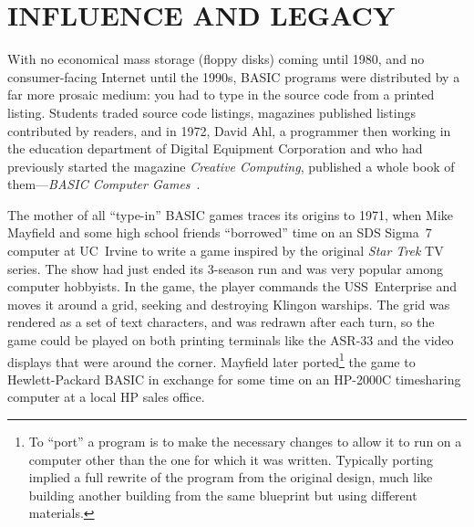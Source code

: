

\section{INFLUENCE AND LEGACY}


With no economical mass storage (floppy disks) coming until 1980, and no
consumer-facing Internet until the 1990s, BASIC programs were
distributed by a far more prosaic medium: you had to type in the source
code from a printed listing.  Students traded source code listings, 
magazines published listings contributed by readers, and in 1972, David
Ahl, a programmer then working in the education department of Digital Equipment
Corporation and who had previously started the magazine \emph{Creative
  Computing}, published a whole book of them---\emph{BASIC Computer
  Games}~\cite{basic_computer_games}. 


The mother of all ``type-in'' BASIC games traces its origins to
1971, when Mike Mayfield and some high school friends ``borrowed'' time
on an SDS Sigma~7 computer at UC~Irvine to write a game inspired by the
original \emph{Star Trek} TV series.  The show had just ended its 3-season run and
was very popular among computer hobbyists.
In the game, the player commands the USS~Enterprise and moves it around
a grid, seeking and destroying Klingon warships.  The grid was rendered
as a set of text characters, and was redrawn after each turn, so
the game could be played on both printing terminals like the ASR-33 and
the video displays that were around the corner.
Mayfield later ported\footnote{To ``port'' a program is to make the
  necessary changes to allow it to run on a computer other than the
  one for which it was written.  Typically porting implied a full
  rewrite of the program from the original design, much like building another building from the
  same blueprint but using different materials.}
the game to Hewlett-Packard BASIC in exchange for
some time on an HP-2000C timesharing computer at a local HP sales
office.

